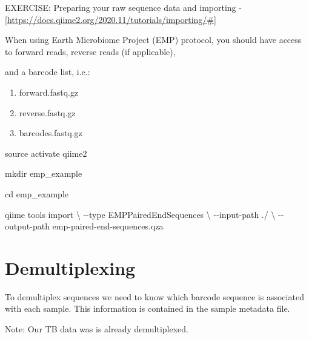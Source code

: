 \documentclass[
]{book}
\newenvironment{Shaded}{\begin{snugshade}}{\end{snugshade}}
\newcommand{\BuiltInTok}[1]{#1}
\newcommand{\DataTypeTok}[1]{\textcolor[rgb]{0.13,0.29,0.53}{#1}}
\newcommand{\ExtensionTok}[1]{#1}
\newcommand{\FunctionTok}[1]{\textcolor[rgb]{0.00,0.00,0.00}{#1}}
\newcommand{\NormalTok}[1]{#1}
\providecommand{\tightlist}{%
  \setlength{\itemsep}{0pt}\setlength{\parskip}{0pt}}
\begin{document}
EXERCISE: Preparing your raw sequence data and importing -{[}\url{https://docs.qiime2.org/2020.11/tutorials/importing/\#}{]}

When using Earth Microbiome Project (EMP) protocol, you should have access to forward reads, reverse reads (if applicable),

and a barcode list, i.e.:

\begin{enumerate}
\def\labelenumi{\arabic{enumi}.}
\tightlist
\item
  forward.fastq.gz
\item
  reverse.fastq.gz
\item
  barcodes.fastq.gz
\end{enumerate}

\begin{Shaded}
\begin{Highlighting}[]
\BuiltInTok{source}\NormalTok{ activate qiime2}

\FunctionTok{mkdir}\NormalTok{ emp\_example}

\BuiltInTok{cd}\NormalTok{ emp\_example}

\ExtensionTok{qiime}\NormalTok{ tools import }\DataTypeTok{\textbackslash{}}
\NormalTok{{-}{-}type EMPPairedEndSequences }\DataTypeTok{\textbackslash{}}
\NormalTok{{-}{-}input{-}path ./ }\DataTypeTok{\textbackslash{}}
\NormalTok{{-}{-}output{-}path emp{-}paired{-}end{-}sequences.qza}
\end{Highlighting}
\end{Shaded}

\hypertarget{demultiplexing}{%
\section{Demultiplexing}\label{demultiplexing}}

To demultiplex sequences we need to know which barcode sequence is associated with each sample. This information is contained in the sample metadata file.

Note: Our TB data was is already demultiplexed.
\end{document}
